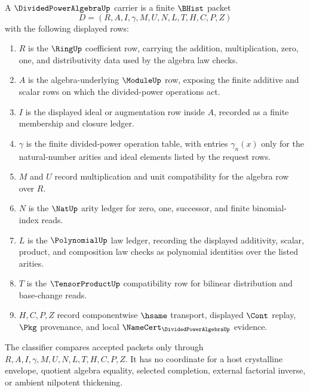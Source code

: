 \begin{definition}
\label{def:divided-power-algebra-carrier}
A $\DividedPowerAlgebraUp$ carrier is a finite $\BHist$ packet
$$
D=(R,A,I,\gamma,M,U,N,L,T,H,C,P,Z)
$$
with the following displayed rows:
\begin{enumerate}
\item $R$ is the $\RingUp$ coefficient row, carrying the addition, multiplication, zero, one, and distributivity data used by the algebra law checks.
\item $A$ is the algebra-underlying $\ModuleUp$ row, exposing the finite additive and scalar rows on which the divided-power operations act.
\item $I$ is the displayed ideal or augmentation row inside $A$, recorded as a finite membership and closure ledger.
\item $\gamma$ is the finite divided-power operation table, with entries $\gamma_n(x)$ only for the natural-number arities and ideal elements listed by the request rows.
\item $M$ and $U$ record multiplication and unit compatibility for the algebra row over $R$.
\item $N$ is the $\NatUp$ arity ledger for zero, one, successor, and finite binomial-index reads.
\item $L$ is the $\PolynomialUp$ law ledger, recording the displayed additivity, scalar, product, and composition law checks as polynomial identities over the listed arities.
\item $T$ is the $\TensorProductUp$ compatibility row for bilinear distribution and base-change reads.
\item $H,C,P,Z$ record componentwise $\hsame$ transport, displayed $\Cont$ replay, $\Pkg$ provenance, and local $\NameCert_{\DividedPowerAlgebraUp}$ evidence.
\end{enumerate}
The classifier compares accepted packets only through $R,A,I,\gamma,M,U,N,L,T,H,C,P,Z$. It has no coordinate for a host crystalline envelope, quotient algebra equality, selected completion, external factorial inverse, or ambient nilpotent thickening.
\end{definition}

